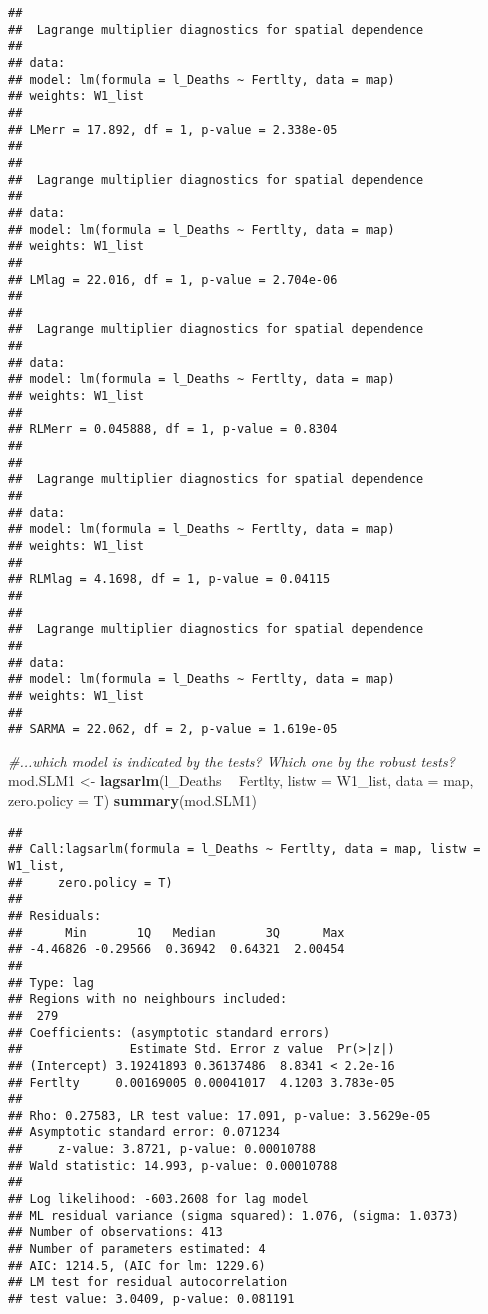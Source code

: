 \documentclass[]{article}
\newenvironment{Shaded}{\begin{snugshade}}{\end{snugshade}}
\newcommand{\KeywordTok}[1]{\textcolor[rgb]{0.13,0.29,0.53}{\textbf{#1}}}
\newcommand{\DataTypeTok}[1]{\textcolor[rgb]{0.13,0.29,0.53}{#1}}
\newcommand{\StringTok}[1]{\textcolor[rgb]{0.31,0.60,0.02}{#1}}
\newcommand{\CommentTok}[1]{\textcolor[rgb]{0.56,0.35,0.01}{\textit{#1}}}
\newcommand{\OperatorTok}[1]{\textcolor[rgb]{0.81,0.36,0.00}{\textbf{#1}}}
\newcommand{\NormalTok}[1]{#1}
\begin{document}
\begin{verbatim}
## 
##  Lagrange multiplier diagnostics for spatial dependence
## 
## data:  
## model: lm(formula = l_Deaths ~ Fertlty, data = map)
## weights: W1_list
## 
## LMerr = 17.892, df = 1, p-value = 2.338e-05
## 
## 
##  Lagrange multiplier diagnostics for spatial dependence
## 
## data:  
## model: lm(formula = l_Deaths ~ Fertlty, data = map)
## weights: W1_list
## 
## LMlag = 22.016, df = 1, p-value = 2.704e-06
## 
## 
##  Lagrange multiplier diagnostics for spatial dependence
## 
## data:  
## model: lm(formula = l_Deaths ~ Fertlty, data = map)
## weights: W1_list
## 
## RLMerr = 0.045888, df = 1, p-value = 0.8304
## 
## 
##  Lagrange multiplier diagnostics for spatial dependence
## 
## data:  
## model: lm(formula = l_Deaths ~ Fertlty, data = map)
## weights: W1_list
## 
## RLMlag = 4.1698, df = 1, p-value = 0.04115
## 
## 
##  Lagrange multiplier diagnostics for spatial dependence
## 
## data:  
## model: lm(formula = l_Deaths ~ Fertlty, data = map)
## weights: W1_list
## 
## SARMA = 22.062, df = 2, p-value = 1.619e-05
\end{verbatim}

\begin{Shaded}
\begin{Highlighting}[]
\CommentTok{#...which model is indicated by the tests? Which one by the robust tests?}
\NormalTok{mod.SLM1 <-}\StringTok{ }\KeywordTok{lagsarlm}\NormalTok{(l_Deaths }\OperatorTok{~}\StringTok{ }\NormalTok{Fertlty, }\DataTypeTok{listw =}\NormalTok{ W1_list, }\DataTypeTok{data =}\NormalTok{ map, }\DataTypeTok{zero.policy =}\NormalTok{ T)}
\KeywordTok{summary}\NormalTok{(mod.SLM1)}
\end{Highlighting}
\end{Shaded}

\begin{verbatim}
## 
## Call:lagsarlm(formula = l_Deaths ~ Fertlty, data = map, listw = W1_list, 
##     zero.policy = T)
## 
## Residuals:
##      Min       1Q   Median       3Q      Max 
## -4.46826 -0.29566  0.36942  0.64321  2.00454 
## 
## Type: lag 
## Regions with no neighbours included:
##  279 
## Coefficients: (asymptotic standard errors) 
##               Estimate Std. Error z value  Pr(>|z|)
## (Intercept) 3.19241893 0.36137486  8.8341 < 2.2e-16
## Fertlty     0.00169005 0.00041017  4.1203 3.783e-05
## 
## Rho: 0.27583, LR test value: 17.091, p-value: 3.5629e-05
## Asymptotic standard error: 0.071234
##     z-value: 3.8721, p-value: 0.00010788
## Wald statistic: 14.993, p-value: 0.00010788
## 
## Log likelihood: -603.2608 for lag model
## ML residual variance (sigma squared): 1.076, (sigma: 1.0373)
## Number of observations: 413 
## Number of parameters estimated: 4 
## AIC: 1214.5, (AIC for lm: 1229.6)
## LM test for residual autocorrelation
## test value: 3.0409, p-value: 0.081191
\end{verbatim}
\end{document}
